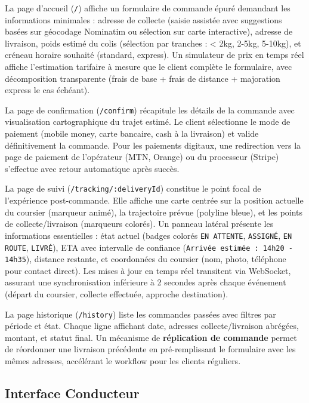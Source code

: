 La page d'accueil (\texttt{/}) affiche un formulaire de commande épuré demandant les informations minimales : adresse de collecte (saisie assistée avec suggestions basées sur géocodage Nominatim ou sélection sur carte interactive), adresse de livraison, poids estimé du colis (sélection par tranches : < 2kg, 2-5kg, 5-10kg), et créneau horaire souhaité (standard, express). Un simulateur de prix en temps réel affiche l'estimation tarifaire à mesure que le client complète le formulaire, avec décomposition transparente (frais de base + frais de distance + majoration express le cas échéant).

La page de confirmation (\texttt{/confirm}) récapitule les détails de la commande avec visualisation cartographique du trajet estimé. Le client sélectionne le mode de paiement (mobile money, carte bancaire, cash à la livraison) et valide définitivement la commande. Pour les paiements digitaux, une redirection vers la page de paiement de l'opérateur (MTN, Orange) ou du processeur (Stripe) s'effectue avec retour automatique après succès.

La page de suivi (\texttt{/tracking/:deliveryId}) constitue le point focal de l'expérience post-commande. Elle affiche une carte centrée sur la position actuelle du coursier (marqueur animé), la trajectoire prévue (polyline bleue), et les points de collecte/livraison (marqueurs colorés). Un panneau latéral présente les informations essentielles : état actuel (badges colorés \texttt{EN ATTENTE}, \texttt{ASSIGNÉ}, \texttt{EN ROUTE}, \texttt{LIVRÉ}), ETA avec intervalle de confiance (\texttt{Arrivée estimée : 14h20 - 14h35}), distance restante, et coordonnées du coursier (nom, photo, téléphone pour contact direct). Les mises à jour en temps réel transitent via WebSocket, assurant une synchronisation inférieure à 2 secondes après chaque événement (départ du coursier, collecte effectuée, approche destination).

La page historique (\texttt{/history}) liste les commandes passées avec filtres par période et état. Chaque ligne affichant date, adresses collecte/livraison abrégées, montant, et statut final. Un mécanisme de \textbf{réplication de commande} permet de réordonner une livraison précédente en pré-remplissant le formulaire avec les mêmes adresses, accélérant le workflow pour les clients réguliers.

\subsection{Interface Conducteur}

